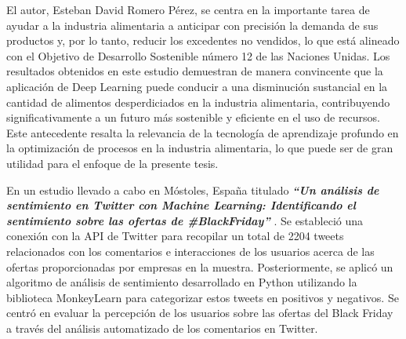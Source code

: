 \vspace{1\baselineskip}
El autor, Esteban David Romero Pérez, se centra en la importante tarea de ayudar a la industria alimentaria a anticipar con precisión la demanda de sus productos y, por lo tanto, reducir los excedentes no vendidos, lo que está alineado con el Objetivo de Desarrollo Sostenible número 12 de las Naciones Unidas. Los resultados obtenidos en este estudio demuestran de manera convincente que la aplicación de Deep Learning puede conducir a una disminución sustancial en la cantidad de alimentos desperdiciados en la industria alimentaria, contribuyendo significativamente a un futuro más sostenible y eficiente en el uso de recursos. Este antecedente resalta la relevancia de la tecnología de aprendizaje profundo en la optimización de procesos en la industria alimentaria, lo que puede ser de gran utilidad para el enfoque de la presente tesis.

\vspace{1\baselineskip}
En un estudio llevado a cabo en Móstoles, España titulado \textbf{\textit{“Un análisis de sentimiento en Twitter con Machine Learning: Identificando el sentimiento sobre las ofertas de \#BlackFriday” }}\cite{saura2018analisis}. Se estableció una conexión con la API de Twitter para recopilar un total de 2204 tweets relacionados con los comentarios e interacciones de los usuarios acerca de las ofertas proporcionadas por empresas en la muestra. Posteriormente, se aplicó un algoritmo de análisis de sentimiento desarrollado en Python utilizando la biblioteca MonkeyLearn para categorizar estos tweets en positivos y negativos. Se centró en evaluar la percepción de los usuarios sobre las ofertas del Black Friday a través del análisis automatizado de los comentarios en Twitter.





